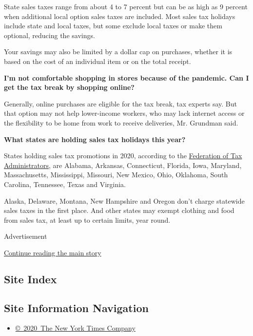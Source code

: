 State sales taxes range from about 4 to 7 percent but can be as high as
9 percent when additional local option sales taxes are included. Most
sales tax holidays include state and local taxes, but some exclude local
taxes or make them optional, reducing the savings.

Your savings may also be limited by a dollar cap on purchases, whether
it is based on the cost of an individual item or on the total receipt.

\textbf{I'm not comfortable shopping in stores because of the pandemic.
Can I get the tax break by shopping online?}

Generally, online purchases are eligible for the tax break, tax experts
say. But that option may not help lower-income workers, who may lack
internet access or the flexibility to be home from work to receive
deliveries, Mr. Grundman said.

\textbf{What states are holding sales tax holidays this year?}

States holding sales tax promotions in 2020, according to the
\href{https://www.taxadmin.org/2020-sales-tax-holiday}{Federation of Tax
Administrators}, are Alabama, Arkansas, Connecticut, Florida, Iowa,
Maryland, Massachusetts, Mississippi, Missouri, New Mexico, Ohio,
Oklahoma, South Carolina, Tennessee, Texas and Virginia.

Alaska, Delaware, Montana, New Hampshire and Oregon don't charge
statewide sales taxes in the first place. And other states may exempt
clothing and food from sales tax, at least up to certain limits, year
round.

Advertisement

\protect\hyperlink{after-bottom}{Continue reading the main story}

\hypertarget{site-index}{%
\subsection{Site Index}\label{site-index}}

\hypertarget{site-information-navigation}{%
\subsection{Site Information
Navigation}\label{site-information-navigation}}

\begin{itemize}
\tightlist
\item
  \href{https://help.nytimes.com/hc/en-us/articles/115014792127-Copyright-notice}{©~2020~The
  New York Times Company}
\end{itemize}

